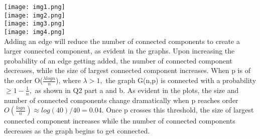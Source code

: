 \documentclass[12pt]{article}
\begin{document}
\texttt{[image: img1.png]} \\
\texttt{[image: img2.png]} \\
\texttt{[image: img3.png]}\\
\texttt{[image: img4.png]}\\

Adding an edge will reduce the number of connected components to
create a larger connected component, as evident in the graphs.
Upon increasing the probability of an edge getting added,
the number of connected component decreases, while the size of
largest connected component increases. When p is of the order
O($\frac {\lambda logn} {n}$), where $\lambda > 1,$ the graph 
G(n,p) is connected with a probability $\ge 1- \frac{1}{n}, $
as shown in Q2 part a and b. As evident in the plots, the 
size and number of connected components change dramatically
when p reaches order $O(\frac {logn} {n}) \approx log(40)/40=0.04.$ 
Once p crosses this threshold, the size of largest connected component
increases while the number of connected components decreases as 
the graph begins to get connected. 
\end{document}
